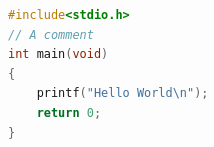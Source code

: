 \documentclass{article}
\begin{document}

\begin{lstlisting}[language=C, caption={C Code Listing}]
#include<stdio.h>
// A comment
int main(void)
{
	printf("Hello World\n");
	return 0;
}
\end{lstlisting}
\end{document}
